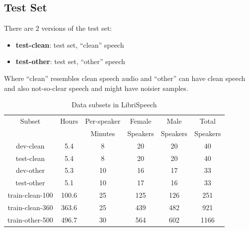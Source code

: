 \subsection{Test Set}
There are 2 versions of the test set:
\begin{itemize}
    \item \textbf{test-clean}: test set, “clean” speech
    \item \textbf{test-other}: test set, “other” speech
\end{itemize}
Where “clean” resembles clean speech audio and “other” can have clean speech and also not-so-clear speech and might have noisier samples.

\begin{table}[t]
    \centering
    \begin{tabular}{|c|c|c|c|c|c|}
        \hline
        Subset          & Hours & Per-speaker & Female   & Male     & Total    \\
                        &       & Minutes     & Speakers & Speakers & Speakers \\
        \hline
        dev-clean       & 5.4   & 8           & 20       & 20       & 40       \\
        \hline
        test-clean      & 5.4   & 8           & 20       & 20       & 40       \\
        \hline
        dev-other       & 5.3   & 10          & 16       & 17       & 33       \\
        \hline
        test-other      & 5.1   & 10          & 17       & 16       & 33       \\
        \hline
        train-clean-100 & 100.6 & 25          & 125      & 126      & 251      \\
        \hline
        train-clean-360 & 363.6 & 25          & 439      & 482      & 921      \\
        \hline
        train-other-500 & 496.7 & 30          & 564      & 602      & 1166     \\
        \hline
    \end{tabular}
    \caption{Data subsets in LibriSpeech}
    \label{tab:librispeech-subsets}
\end{table}

